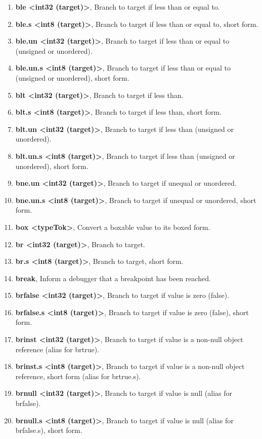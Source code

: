 \documentclass[12pt,a4paper,twoside]{report}
\begin{document}
\begin{enumerate}
\item \textbf{ble <int32 (target)>}, Branch to target if less than or equal to.
\item \textbf{ble.s <int8 (target)>}, Branch to target if less than or equal to, short form.
\item \textbf{ble.un <int32 (target)>}, Branch to target if less than or equal to (unsigned or
unordered).
\item \textbf{ble.un.s <int8 (target)>}, Branch to target if less than or equal to (unsigned or
unordered), short form.
\item \textbf{blt <int32 (target)>}, Branch to target if less than.
\item \textbf{blt.s <int8 (target)>}, Branch to target if less than, short form.
\item \textbf{blt.un <int32 (target)>}, Branch to target if less than (unsigned or unordered).
\item \textbf{blt.un.s <int8 (target)>}, Branch to target if less than (unsigned or unordered),
short form.
\item \textbf{bne.un <int32 (target)>}, Branch to target if unequal or unordered.
\item \textbf{bne.un.s <int8 (target)>}, Branch to target if unequal or unordered, short form.
\item \textbf{box <typeTok>}, Convert a boxable value to its boxed form.
\item \textbf{br <int32 (target)>}, Branch to target.
\item \textbf{br.s <int8 (target)>}, Branch to target, short form.
\item \textbf{break}, Inform a debugger that a breakpoint has been reached.
\item \textbf{brfalse <int32 (target)>}, Branch to target if value is zero (false).
\item \textbf{brfalse.s <int8 (target)>}, Branch to target if value is zero (false), short form.
\item \textbf{brinst <int32 (target)>}, Branch to target if value is a non-null object reference
(alias for brtrue).
\item \textbf{brinst.s <int8 (target)>}, Branch to target if value is a non-null object reference,
short form (alias for brtrue.s).
\item \textbf{brnull <int32 (target)>}, Branch to target if value is null (alias for brfalse).
\item \textbf{brnull.s <int8 (target)>}, Branch to target if value is null (alias for brfalse.s), short form.

\end{enumerate}
\end{document}
